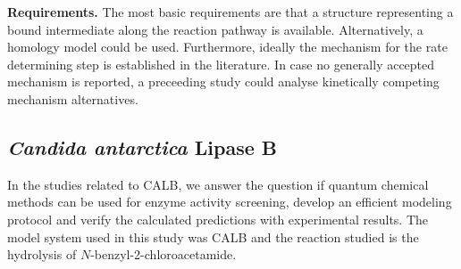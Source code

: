 \textbf{Requirements.}
The most basic requirements are that a structure representing a bound intermediate along the reaction pathway is available.
Alternatively, a homology model could be used.
Furthermore, ideally the mechanism for the rate determining step is established in the literature.
In case no generally accepted mechanism is reported, a preceeding study could analyse kinetically competing mechanism alternatives.

\subsection{{\textit{Candida antarctica} Lipase B}}
In the studies related to CALB\cite{10.1371/journal.pone.0049849, hediger2013silico}, we answer the question if quantum chemical methods can be used for enzyme activity screening, develop an efficient modeling protocol and verify the calculated predictions with experimental results.
The model system used in this study was CALB and the reaction studied is the hydrolysis of $N$-benzyl-2-chloroacetamide.


